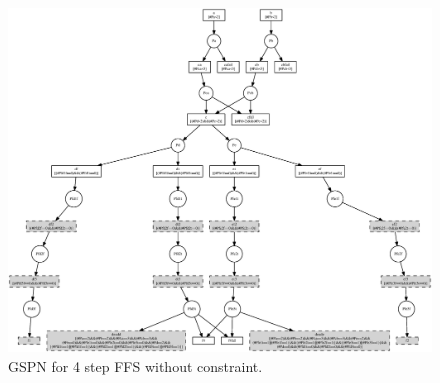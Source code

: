 \begin{figure}[p]
\begin{center}
	\includegraphics[width=\hsize]{fig/FFSx.eps}
\end{center}
\caption{GSPN for 4 step FFS without constraint.}
\label{fig:FFSx}
\end{figure}

\clearpage

%
%

